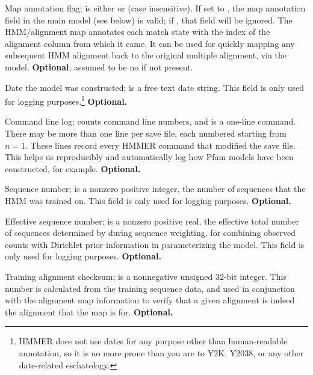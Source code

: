 \begin{sreitems}{}
\item [\emprog{MAP <s>}] Map annotation flag;  is either
 or  (case insensitive).  If set to , the
map annotation field in the main model (see below) is valid; if
, that field will be ignored.  The HMM/alignment map
annotates each match state with the index of the alignment column from
which it came. It can be used for quickly mapping any subsequent
HMM alignment back to the original multiple alignment, via the model.
\textbf{Optional}; assumed to be no if not present.

\item [\emprog{DATE <s>}] Date the model was constructed; 
is a free text date string.  This field is only used for logging
purposes.\footnote{HMMER does not use dates for any purpose other than
human-readable annotation, so it is no more prone than you are to Y2K,
Y2038, or any other date-related eschatology.} \textbf{Optional.}

\item [\emprog{COM [<n>] <s>}] Command line log;  counts
command line numbers, and  is a one-line command. There may
be more than one  line per save file, each numbered starting
from $n=1$. These lines record every HMMER command that modified the
save file. This helps us reproducibly and automatically log how Pfam
models have been constructed, for example. \textbf{Optional.}

\item [\emprog{NSEQ  <d>}] Sequence number;  is a nonzero
positive integer, the number of sequences that the HMM was trained on.
This field is only used for logging purposes.
\textbf{Optional.}

\item [\emprog{EFFN <f>}] Effective sequence number;  is a
nonzero positive real, the effective total number of sequences
determined by  during sequence weighting, for combining
observed counts with Dirichlet prior information in parameterizing the
model. This field is only used for logging purposes.
\textbf{Optional.}

\item [\emprog{CKSUM <d>}] Training alignment checksum;  is
  a nonnegative unsigned 32-bit integer. This number is calculated
  from the training sequence data, and used in conjunction with the
  alignment map information to verify that a given alignment is indeed
  the alignment that the map is for. \textbf{Optional.}


\end{sreitems}
